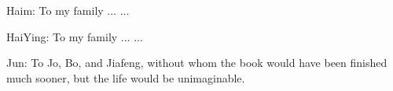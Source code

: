 \cleardoublepage\newpage
\thispagestyle{empty}

\begin{center}
  Haim: To my family ... ...
  

  \bigskip

  HaiYing: To my family ... ...

  \bigskip

  Jun: To Jo, Bo, and Jiafeng, without whom the book would have been finished
  much sooner, but the life would be unimaginable.
  
\end{center}

\setlength{\abovedisplayskip}{-5pt}
\setlength{\abovedisplayshortskip}{-5pt}
